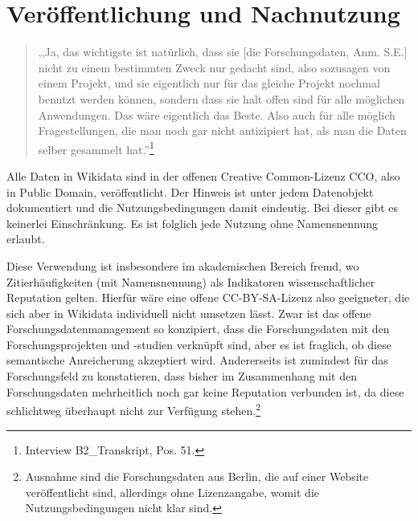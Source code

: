 \section{Veröffentlichung und Nachnutzung}

\begin{quote}
    ,,Ja, das wichtigste ist natürlich, dass sie [die Forschungsdaten, Anm. S.E.] nicht zu einem bestimmten Zweck nur gedacht sind, also sozusagen von einem Projekt, und sie eigentlich nur für das gleiche Projekt nochmal benutzt werden können, sondern dass sie halt offen sind für alle möglichen Anwendungen. Das wäre eigentlich das Beste. Also auch für alle möglich Fragestellungen, die man noch gar nicht antizipiert hat, als man die Daten selber gesammelt hat.''\footnote{Interview B2\_Transkript, Pos. 51.}
\end{quote}

Alle Daten in Wikidata sind in der offenen Creative Common-Lizenz CCO, also in Public Domain, veröffentlicht. Der Hinweis ist unter jedem Datenobjekt dokumentiert und die Nutzungsbedingungen damit eindeutig. Bei dieser gibt es keinerlei Einschränkung. Es ist folglich jede Nutzung ohne Namensnennung erlaubt.

Diese Verwendung ist insbesondere im akademischen Bereich fremd, wo Zitierhäufigkeiten (mit Namensnennung) als Indikatoren wissenschaftlicher Reputation gelten. Hierfür wäre eine offene CC-BY-SA-Lizenz also geeigneter, die sich aber in Wikidata individuell nicht umsetzen lässt. Zwar ist das offene Forschungsdatenmanagement so konzipiert, dass die Forschungsdaten mit den Forschungsprojekten und -studien verknüpft sind, aber es ist fraglich, ob diese semantische Anreicherung akzeptiert wird. Andererseits ist zumindest für das Forschungsfeld zu konstatieren, dass bisher im Zusammenhang mit den Forschungsdaten mehrheitlich noch gar keine Reputation verbunden ist, da diese schlichtweg überhaupt nicht zur Verfügung stehen.\footnote{Ausnahme sind die Forschungsdaten aus Berlin, die auf einer Website veröffentlicht sind, allerdings ohne Lizenzangabe, womit die Nutzungsbedingungen nicht klar sind.}

